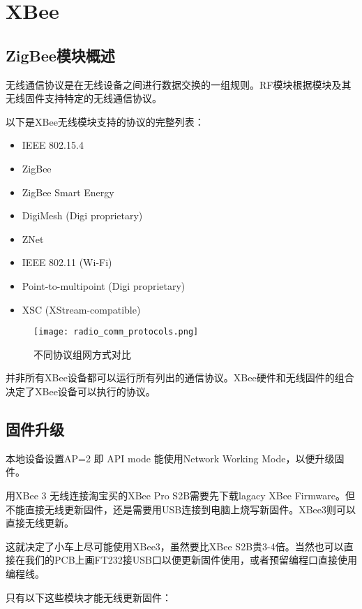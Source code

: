 \chapter{XBee}
\label{cha:XBee}

\section{ZigBee模块概述}

无线通信协议是在无线设备之间进行数据交换的一组规则。RF模块根据模块及其无线固件支持特定的无线通信协议。

以下是XBee无线模块支持的协议的完整列表：

\begin{itemize}
    \item IEEE 802.15.4
    \item ZigBee
    \item ZigBee Smart Energy
    \item DigiMesh (Digi proprietary)
    \item ZNet
    \item IEEE 802.11 (Wi-Fi)
    \item Point-to-multipoint (Digi proprietary)
    \item XSC (XStream-compatible)
\end{itemize}

\begin{figure}[htbp]
    \centering
    \texttt{[image: radio\_comm\_protocols.png]}
    \caption{不同协议组网方式对比}
    \label{fig:radio_comm_protocols}
\end{figure}

并非所有XBee设备都可以运行所有列出的通信协议。XBee硬件和无线固件的组合决定了XBee设备可以执行的协议。

\section{固件升级}

本地设备设置AP=2 即 API mode 能使用Network Working Mode，以便升级固件。

用XBee 3 无线连接淘宝买的XBee Pro S2B需要先下载lagacy XBee Firmware。但不能直接无线更新固件，还是需要用USB连接到电脑上烧写新固件。XBee3则可以直接无线更新。

这就决定了小车上尽可能使用XBee3，虽然要比XBee S2B贵3-4倍。当然也可以直接在我们的PCB上画FT232接USB口以便更新固件使用，或者预留编程口直接使用编程线。

只有以下这些模块才能无线更新固件：

